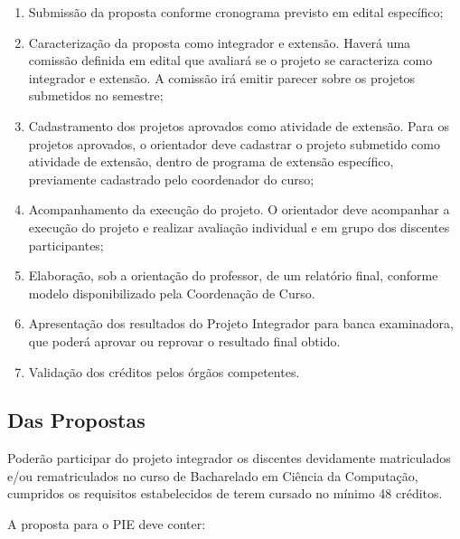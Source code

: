 \documentclass[11pt,a4paper]{report}
\begin{document}
\begin{enumerate}
    
\item Submissão da proposta conforme cronograma previsto em edital específico;

\item Caracterização da proposta como integrador e extensão. Haverá uma comissão definida em edital que avaliará se o projeto se caracteriza como integrador e extensão. A comissão irá emitir parecer sobre os projetos submetidos no semestre;

\item Cadastramento dos projetos aprovados como atividade de extensão. Para os projetos aprovados, o orientador deve cadastrar o projeto submetido como atividade de extensão, dentro de programa de extensão específico, previamente cadastrado pelo coordenador do curso;

\item Acompanhamento da execução do projeto. O orientador deve acompanhar a execução do projeto e realizar avaliação individual e em grupo dos discentes participantes;

\item Elaboração, sob a orientação do professor, de um relatório final, conforme modelo disponibilizado pela Coordenação de Curso.

\item Apresentação dos resultados do Projeto Integrador para banca examinadora, que poderá aprovar ou reprovar o resultado final obtido. 

\item Validação dos créditos pelos órgãos competentes.

\end{enumerate}

\subsection{Das Propostas}

Poderão participar do projeto integrador os discentes devidamente matriculados e/ou rematriculados no curso de Bacharelado em Ciência da Computação, cumpridos os requisitos estabelecidos de terem cursado no mínimo 48 créditos.

A proposta para o PIE deve conter:
\end{document}
